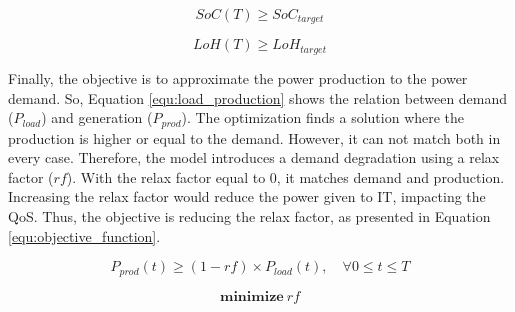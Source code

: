 \begin{equation}
    \label{equ:soc_target}
    SoC(T) \ge SoC_{target}
\end{equation}

\begin{equation}
    \label{equ:loh_target}
    LoH(T) \ge LoH_{target}
\end{equation}

Finally, the objective is to approximate the power production to the power demand. So, Equation \ref{equ:load_production} shows the relation between demand ($P_{load}$) and generation ($P_{prod}$). The optimization finds a solution where the production is higher or equal to the demand. However, it can not match both in every case. Therefore, the model introduces a demand degradation using a relax factor ($rf$). With the relax factor equal to 0, it matches demand and production. Increasing the relax factor would reduce the power given to IT, impacting the QoS. Thus, the objective is reducing the relax factor, as presented in Equation \ref{equ:objective_function}.

\begin{equation}
    \label{equ:load_production}
    P_{prod}(t) \ge (1 - rf) \times P_{load}(t), \quad \forall 0 \le t \le T
\end{equation}

\begin{equation}
    \label{equ:objective_function}
    \mathbf{minimize}\ rf
\end{equation}





